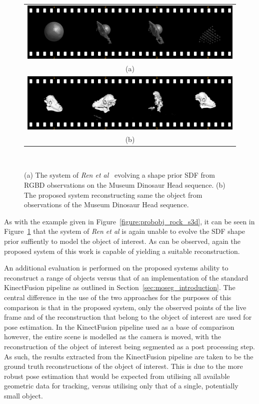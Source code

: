 \begin{figure}[!htbp]
  \centering
  \begin{tabular}{@{}c@{}}
    \includegraphics[width=.6\linewidth]{figures/object_recon/strips/dino_s3d.png} \\
    (a) \\
    \includegraphics[width=.6\linewidth]{figures/object_recon/strips/dino.png} \\ 
    (b) \\
  \end{tabular}
  \caption[Probabilistic Object Reconstruction Qualitative Results II]
  {(a) The system of \textit{Ren et al}~\cite{Ren2013} evolving a shape prior SDF 
  from RGBD observations on the Museum Dinosaur Head sequence. (b) The proposed system 
  reconstructing same the object from observations of the Museum Dinosaur Head sequence.}
~\label{figure:probobj_dino_s3d}
\end{figure}

As with the example given in Figure~\ref{figure:probobj_rock_s3d}, it can be seen in 
Figure~\ref{figure:probobj_dino_s3d} that the system of \textit{Ren et al} is again 
unable to evolve the SDF shape prior suffiently to model the object of interest. As 
can be observed, again the proposed system of this work is capable of yielding a suitable 
reconstruction.

An additional evaluation is performed on the proposed systems ability to reconstruct 
a range of objects versus that of an implementation of the standard KinectFusion 
pipeline as outlined in Section~\ref{sec:moseg_introduction}. The central difference in 
the use of the two approaches for the purposes of this comparison is that in the proposed 
system, only the observed points of the live frame and of the reconstruction that belong to 
the object of interest are used for pose estimation. In the KinectFusion pipeline used 
as a base of comparison however, the entire scene is modelled as the camera is moved, 
with the reconstruction of the object of interest being segmented as a post processing 
step. As such, the results extracted from the KinectFusion pipeline are taken to be the 
ground truth reconstructions of the object of interest. This is due to the more robust 
pose estimation that would be expected from utilising all available geometric data 
for tracking, versus utilising only that of a single, potentially small object.

